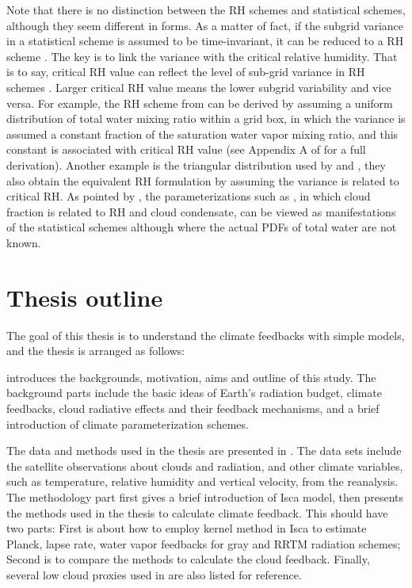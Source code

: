 Note that there is no distinction between the RH schemes and statistical schemes, although they seem different in forms. As a matter of fact, if the subgrid variance in a statistical scheme is assumed to be time-invariant, it can be reduced to a RH scheme \citep{Tompkins2002,Tompkins2005}. The key is to link the variance with the critical relative humidity. That is to say, critical RH value can reflect the level of sub-grid variance in RH schemes \citep{Quaas2012}. Larger critical RH value means the lower subgrid variability and vice versa. For example, the RH scheme from \cite{Sundqvist1978} can be derived by assuming a uniform distribution of total water mixing ratio within a grid box, in which the variance is assumed a constant fraction of the saturation water vapor mixing ratio, and this constant is associated with critical RH value (see Appendix A of \cite{Quaas2012} for a full derivation). Another example is the triangular distribution used by \cite{Smith1990} and \cite{Park2014}, they also obtain the equivalent RH formulation by assuming the variance is related to critical RH. As pointed by \cite{Tompkins2002}, the parameterizations such as \cite{Xu1996}, in which cloud fraction is related to RH and cloud condensate, can be viewed as manifestations of the statistical schemes although where the actual PDFs of total water are not known. %

\section{Thesis outline}
\label{sec:thesis_layout}

The goal of this thesis is to understand the climate feedbacks with simple models, and the thesis is arranged as follows:

 introduces the backgrounds, motivation, aims and outline of this study. The background parts include the basic ideas of Earth's radiation budget, climate feedbacks, cloud radiative effects and their feedback mechanisms, and a brief introduction of climate parameterization schemes.

 The data and methods used in the thesis are presented in . The data sets include the satellite observations about clouds and radiation, and other climate variables, such as temperature, relative humidity and vertical velocity, from the reanalysis. The methodology part first gives a brief introduction of Isca model, then presents the methods used in the thesis to calculate climate feedback. This should have two parts: First is about how to employ kernel method in Isca to estimate Planck, lapse rate, water vapor feedbacks for gray and RRTM radiation schemes; Second is to compare the methods to calculate the cloud feedback. Finally, several low cloud proxies used in  are also listed for reference.

